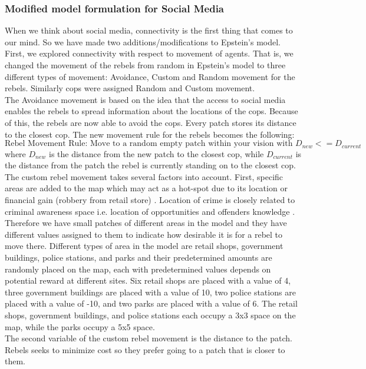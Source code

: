 \documentclass[a4paper,11pt]{article}
\begin{document}
\subsubsection{Modified model formulation for Social Media}
When we think about social media, connectivity is the first thing that comes to our mind. So we have made two additions/modifications to Epstein's model. First, we explored connectivity with respect to movement of agents. That is, we changed the movement of the rebels from random in Epstein's model to three different types of movement: Avoidance, Custom and Random movement for the rebels. Similarly cops were assigned Random and Custom movement.
\\
The Avoidance movement is based on the idea that the access to social media enables the rebels to spread information about the locations of the cops. Because of this, the rebels are now able to avoid the cops. Every patch stores its distance to the closest cop. The new movement rule for the rebels becomes the following:
\[\text{Rebel Movement Rule: Move to a random empty patch within your vision with } D_{new} <= D_{current}\]
where $D_{new}$ is the distance from the new patch to the closest cop, while $D_{current}$ is the distance from the patch the rebel is currently standing on to the closest cop. 
\\
The custom rebel movement takes several factors into account. First, specific areas are added to the map which may act as a hot-spot due to its location or financial gain (robbery from retail store) \cite{davies2013mathematical}. Location of crime is closely related to criminal awareness space i.e. location of opportunities and offenders knowledge \cite{brantingham1993nodes}. Therefore we have small patches of different areas in the model and they have different values assigned to them to indicate how desirable it is for a rebel to move there. Different types of area in the model are retail shops, government buildings, police stations, and parks and their predetermined amounts are randomly placed on the map, each with predetermined values depends on potential reward at different sites. Six retail shops are placed with a value of 4, three government buildings are placed with a value of 10, two police stations are placed with a value of -10, and two parks are placed with a value of 6. The retail shops, government buildings, and police stations each occupy a 3x3 space on the map, while the parks occupy a 5x5 space.
\\
The second variable of the custom rebel movement is the distance to the patch. Rebels seeks to minimize cost so they prefer going to a patch that is closer to them.
\end{document}
